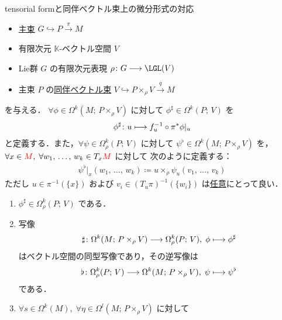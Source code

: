 \documentclass[geometry_main]{subfiles}
\begin{document}
\begin{myprop}[label=prop:assoc-basic]{tensorial formと同伴ベクトル束上の微分形式の対応}
    \begin{itemize}
        \item \hyperref[def.PFD]{主束} $G \hookrightarrow P \xrightarrow{\pi} M$
        \item 有限次元 $\mathbb{K}$-ベクトル空間 $V$
        \item Lie群 $G$ の有限次元表現 $\rho \colon G \lto \LGL(V)$
        \item 主束 $P$ の\hyperref[def:associated-vect]{同伴ベクトル束} $V \hookrightarrow P \times_\rho V \xrightarrow{q} M$
    \end{itemize}
    を与える．
    $\forall \phi \in \Omega^k (M;\, P \times_\rho V)$ に対して
    $\phi^\sharp \in \Omega^k (P;\, V)$ を
    \begin{align}
        \phi^\sharp \colon u \longmapsto f_u^{-1} \circ \pi^* \phi|_u
    \end{align}
    と定義する．また，$\forall \psi \in \Omega_\rho^k (P;\, V)$ に対して $\psi^\flat \in \Omega^k (M;\, P \times_\rho V)$ を，$\forall x \in \textcolor{red}{M},\; \forall w_1,\, \dots,\, w_k \in T_x \textcolor{red}{M}$ に対して
    次のように定義する：
    \begin{align}
        \label{def:flat}
        \psi^\flat|_x (w_1,\, \dots,\, w_k) \coloneqq u \times_\rho \psi_u (v_1,\, \dots,\, v_k)
    \end{align}
    ただし $u \in \pi^{-1}(\{x\})$ および $v_i \in (T_u \pi)^{-1} (\{w_i\})$ は\underline{任意}にとって良い．
    \begin{enumerate}
        \item $\phi^\sharp \in \Omega^k_\rho (P;\, V)$ である．
        \item 写像
        \begin{align}
            \sharp \colon \Omega^k (M;\, P \times_\rho V) \longrightarrow \Omega^k_\rho(P;\, V),\; \phi \longmapsto \phi^\sharp    
        \end{align}
        はベクトル空間の同型写像であり，その逆写像は
        \begin{align}
            \flat \colon \Omega^k_\rho(P;\, V) \longrightarrow \Omega^k (M;\, P \times_\rho V),\; \psi \longmapsto \psi^\flat
        \end{align}
        である．
        \item $\forall s \in \Omega^k(M),\; \forall \eta \in \Omega^l(M;\, P \times_\rho V)$ に対して

\end{enumerate}
\end{myprop}
\end{document}
